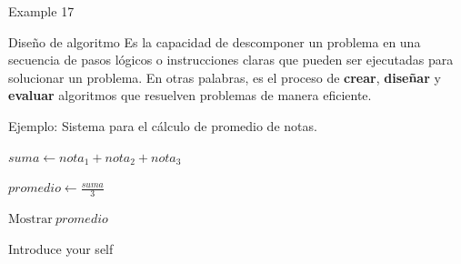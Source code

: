 \documentclass[aspectratio=169]{beamer}
\renewcommand{\alert}[1]{\textbf{\color{swufe}#1}}
\newcommand{\alertplain}[1]{{\color{swufe}#1}}
\begin{document}
    \begin{frame}{Example 17}
        \begin{exampleblock}{Diseño de algoritmo}
            Es la capacidad de descomponer un problema en una secuencia de pasos lógicos o instrucciones claras que pueden ser ejecutadas para solucionar un problema. En otras palabras, es el proceso de \alert{crear}, \alert{diseñar} y \alert{evaluar} algoritmos que resuelven problemas de manera eficiente. \\  %
        \end{exampleblock}

        \alertplain{Ejemplo:} Sistema para el cálculo de promedio de notas. \newline

        \begin{algorithm}[H]
            \DontPrintSemicolon
            
            
            
            $suma \gets nota_1 + nota_2 + nota_3$
            
            $promedio \gets \frac{suma}{3}$ 

            $\text{Mostrar} \: promedio$
            \caption{Promedio de notas.}
        \end{algorithm}
    
        \begin{note}
            {Introduce your self}
        \end{note}
    \end{frame}
\end{document}
